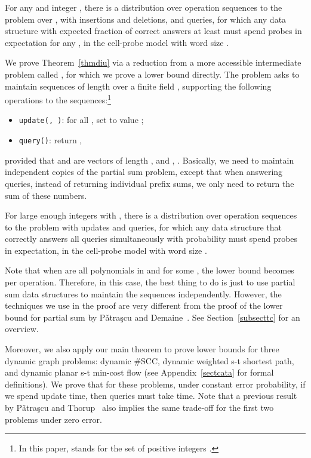 \documentclass[11pt]{article}
\begin{document}
\begin{customthm}{1}
	For any  and integer , there is a distribution over operation sequences to the \diu{} problem over , with  insertions and deletions, and  queries, for which any data structure with expected fraction of correct answers at least  must spend  probes in expectation for any , in the cell-probe model with word size . 
\end{customthm}

We prove Theorem~\ref{thmdiu} via a reduction from a more accessible intermediate problem called \emph{\bps{}}, for which we prove a lower bound directly. The \bps{} problem asks to maintain  sequences  of length  over a finite field , supporting the following operations to the sequences:\footnote{In this paper,  stands for the set of positive integers .}

\begin{itemize}
	\item
		\verb+update(+\verb+, +\verb+)+: for all , set  to value ;
	\item
		\verb+query(+\verb+)+: return ,
\end{itemize}
provided that  and  are vectors of length , and , . Basically, we need to maintain  independent copies of the partial sum problem, except that when answering queries, instead of returning  individual prefix sums, we only need to return the sum of these  numbers. 

\begin{theorem}\label{thmbps}
For large enough integers  with , there is a distribution over operation sequences to the \bps{} problem with  updates and  queries, for which any data structure that correctly answers all queries simultaneously with probability  must spend  probes in expectation, in the cell-probe model with word size .
\end{theorem}

Note that when  are all polynomials in  and  for some , the lower bound becomes  per operation. Therefore, in this case, the best thing to do is just to use  partial sum data structures to maintain the  sequences independently. However, the techniques we use in the proof are very different from the proof of the lower bound for partial sum by P\v{a}tra\c{s}cu and Demaine~\cite{PD04a}. See Section~\ref{subsecttc} for an overview. 

Moreover, we also apply our main theorem to prove lower bounds for three dynamic graph problems: dynamic \#SCC, dynamic weighted s-t shortest path, and dynamic planar s-t min-cost flow (see Appendix~\ref{sectcata} for formal definitions). We prove that for these problems, under constant error probability, if we spend  update time, then queries must take  time. Note that a previous result by P\v{a}tra\c{s}cu and Thorup~\cite{PT11} also implies the same trade-off for the first two problems under zero error. 
\end{document}
